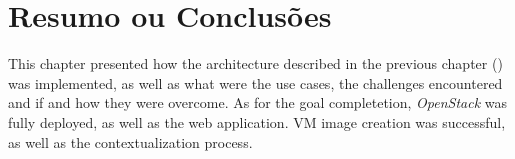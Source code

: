 

\section{Resumo ou Conclusões}

This chapter presented how the architecture described in the previous chapter () was implemented, as well as what were the use cases, the challenges encountered and if and how they were overcome. 
As for the goal completetion, \textit{OpenStack} was fully deployed, as well as the web application. VM image creation was successful, as well as the contextualization process.

